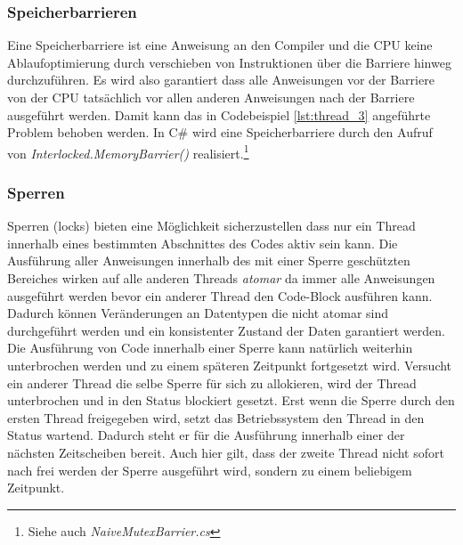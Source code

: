 \subsubsection{Speicherbarrieren}
Eine Speicherbarriere ist eine Anweisung an den Compiler und die CPU keine Ablaufoptimierung durch verschieben von Instruktionen über die Barriere hinweg durchzuführen. Es wird also garantiert dass alle Anweisungen vor der Barriere von der CPU tatsächlich vor allen anderen Anweisungen nach der Barriere ausgeführt werden.\parencite[S. 195]{tanenbaum2016} Damit kann das in Codebeispiel \ref{lst:thread_3} angeführte Problem behoben werden. In C\# wird eine Speicherbarriere durch den Aufruf von \textit{Interlocked.MemoryBarrier()} realisiert.\parencite{ms_interlocked_barrier}\footnote{Siehe auch \textit{NaiveMutexBarrier.cs}}

\subsubsection{Sperren}\label{sss:Sperren}	
Sperren (locks) bieten eine Möglichkeit sicherzustellen dass nur ein Thread innerhalb eines bestimmten Abschnittes des Codes aktiv sein kann. Die Ausführung aller Anweisungen innerhalb des mit einer Sperre geschützten Bereiches wirken auf alle anderen Threads \textit{atomar} da immer alle Anweisungen ausgeführt werden bevor ein anderer Thread den Code-Block ausführen kann. Dadurch können Veränderungen an Datentypen die nicht atomar sind durchgeführt werden und ein konsistenter Zustand der Daten garantiert werden. 
\\Die Ausführung von Code innerhalb einer Sperre kann natürlich weiterhin unterbrochen werden und zu einem späteren Zeitpunkt fortgesetzt wird. Versucht ein anderer Thread die selbe Sperre für sich zu allokieren, wird der Thread unterbrochen und in den Status blockiert gesetzt. Erst wenn die Sperre durch den ersten Thread freigegeben wird, setzt das Betriebssystem den Thread in den Status wartend. Dadurch steht er für die Ausführung innerhalb einer der nächsten Zeitscheiben bereit. Auch hier gilt, dass der zweite Thread nicht sofort nach frei werden der Sperre ausgeführt wird, sondern zu einem beliebigem Zeitpunkt.

